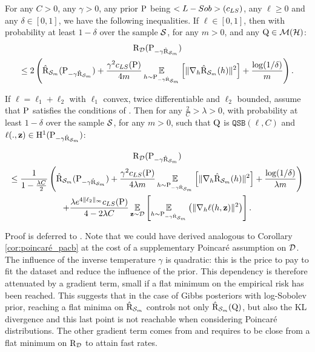 \begin{theorem}\label{th: gibbs_pacb}
For any $C>0$, any $\gamma>0$, any prior $\P$ being $\Lsob(c_{LS})$, any $\ell\geq 0$ and any $\delta\in [0,1]$, we have the following inequalities.
If $\ell\in [0,1]$, then with probability at least $1-\delta$ over the sample $\S$, for any $m>0$, and any $\Q\in\Mcal(\Hcal)$:
\begin{multline*}
    \Risk_{\D}(\P_{-\gamma \hat{\Risk}_{\S_m}}) \\ \leq 2 \LP \hat{\Risk}_{\S_m}(\P_{-\gamma \hat{\Risk}_{\S_m}}) + \frac{\gamma^2 c_{LS}(\P)}{4m} \EE_{h\sim \P_{-\gamma \hat{\Risk}_{\S_m}}}\LB \|\nabla_h \hat{\Risk}_{\S_m}(h) \|^2 \RB + \frac{\log(1/\delta)}{m} \RP .
\end{multline*}

If $\ell= \ell_1+\ell_2$ with $\ell_1$ convex, twice differentiable and $\ell_2$ bounded, assume that $\P$ satisfies the conditions of . Then for any $\frac{2}{C}> \lambda>0$, with probability at least $1-\delta$ over the sample $\S$, for any $m>0$, such that $\Q$ is $\texttt{QSB}(\ell,C)$ and $\ell(.,\z)\in \mathrm{H}^{1}(\P_{-\gamma \hat{\Risk}_{\S_m}})$:

\begin{multline*}
    \Risk_{\D}(\P_{-\gamma \hat{\Risk}_{\S_m}}) \\ \leq 
     \frac{1}{1-\frac{\lambda C}{2}} \LP \hat{\Risk}_{\S_m}(\P_{-\gamma \hat{\Risk}_{\S_m}}) + \frac{\gamma^2 c_{LS}(\P)}{4\lambda m} \EE_{h\sim \P_{-\gamma \hat{\Risk}_{\S_m}}}\LB \|\nabla_h \hat{\Risk}_{\S_m}(h) \|^2 \RB + \frac{\log(1/\delta)}{\lambda m} \RP \\ 
    + \frac{\lambda e^{4\|\ell_2\|_{\infty}}c_{LS}(\P) }{4-2\lambda C} \EE_{\z\sim\D} \LB \EE_{h\sim \P_{-\gamma \hat{\Risk}_{\S_m}}}\LP \|\nabla_h \ell(h,\z)\|^2 \RP \RB .
\end{multline*} 
\end{theorem}
Proof is deferred to .
Note that we could have derived analogous to Corollary \ref{cor:poincaré_pacb} at the cost of a supplementary Poincaré assumption on $\D$.
The influence of the inverse temperature $\gamma$ is quadratic: this is the price to pay to fit the dataset and reduce the influence of the prior.
This dependency is therefore attenuated by a gradient term, small if a flat minimum on the empirical risk has been reached.
This suggests that in the case of Gibbs posteriors with log-Sobolev prior, reaching a flat minima on $\hat{\Risk}_{\S_m}$ controls not only $\hat{\Risk}_{\S_m}(\Q)$, but also the KL divergence and this last point is not reachable when considering Poincaré distributions.
The other gradient term comes from  and requires to be close from a flat minimum on $\Risk_\D$ to attain fast rates. 

